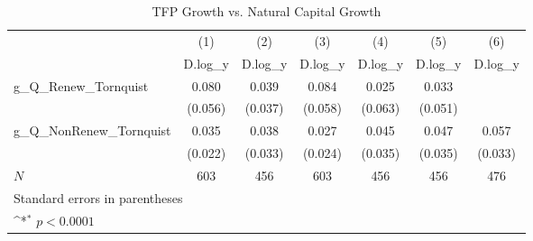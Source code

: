 \begin{table}[htbp]\centering
\def\sym#1{\ifmmode^{#1}\else\(^{#1}\)\fi}
\caption{TFP Growth vs. Natural Capital Growth}
\begin{tabular}{l*{6}{c}}
\hline\hline
            &\multicolumn{1}{c}{(1)}&\multicolumn{1}{c}{(2)}&\multicolumn{1}{c}{(3)}&\multicolumn{1}{c}{(4)}&\multicolumn{1}{c}{(5)}&\multicolumn{1}{c}{(6)}\\
            &\multicolumn{1}{c}{D.log\_y}&\multicolumn{1}{c}{D.log\_y}&\multicolumn{1}{c}{D.log\_y}&\multicolumn{1}{c}{D.log\_y}&\multicolumn{1}{c}{D.log\_y}&\multicolumn{1}{c}{D.log\_y}\\
\hline
g\_Q\_Renew\_Tornquist&       0.080       &       0.039       &       0.084       &       0.025       &       0.033       &                   \\
            &     (0.056)       &     (0.037)       &     (0.058)       &     (0.063)       &     (0.051)       &                   \\
[1em]
g\_Q\_NonRenew\_Tornquist&       0.035       &       0.038       &       0.027       &       0.045       &       0.047       &       0.057       \\
            &     (0.022)       &     (0.033)       &     (0.024)       &     (0.035)       &     (0.035)       &     (0.033)       \\
\hline
\(N\)       &         603       &         456       &         603       &         456       &         456       &         476       \\
\hline\hline
\multicolumn{7}{l}{\footnotesize Standard errors in parentheses}\\
\multicolumn{7}{l}{\footnotesize \sym{*} \(p<0.0001\)}\\
\end{tabular}
\end{table}
